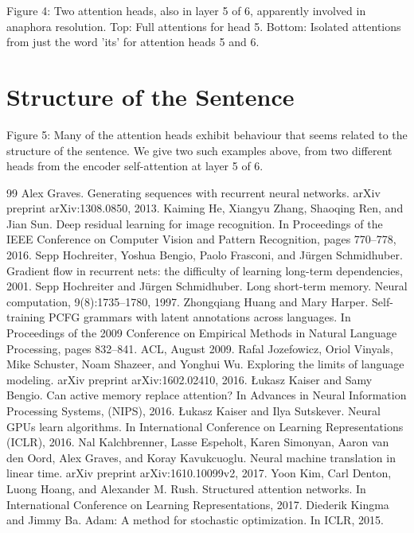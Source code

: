 \documentclass[conference]{IEEEtran}
\begin{document}
Figure 4: Two attention heads, also in layer 5 of 6, apparently involved in anaphora resolution. Top: Full attentions for head 5. Bottom: Isolated attentions from just the word 'its' for attention heads 5 and 6.

\section{Structure of the Sentence}
Figure 5: Many of the attention heads exhibit behaviour that seems related to the structure of the sentence. We give two such examples above, from two different heads from the encoder self-attention at layer 5 of 6.

\begin{thebibliography}{99}
 Alex Graves. Generating sequences with recurrent neural networks. arXiv preprint arXiv:1308.0850, 2013.
 Kaiming He, Xiangyu Zhang, Shaoqing Ren, and Jian Sun. Deep residual learning for image recognition. In Proceedings of the IEEE Conference on Computer Vision and Pattern Recognition, pages 770--778, 2016.
 Sepp Hochreiter, Yoshua Bengio, Paolo Frasconi, and Jürgen Schmidhuber. Gradient flow in recurrent nets: the difficulty of learning long-term dependencies, 2001.
 Sepp Hochreiter and Jürgen Schmidhuber. Long short-term memory. Neural computation, 9(8):1735--1780, 1997.
 Zhongqiang Huang and Mary Harper. Self-training PCFG grammars with latent annotations across languages. In Proceedings of the 2009 Conference on Empirical Methods in Natural Language Processing, pages 832--841. ACL, August 2009.
 Rafal Jozefowicz, Oriol Vinyals, Mike Schuster, Noam Shazeer, and Yonghui Wu. Exploring the limits of language modeling. arXiv preprint arXiv:1602.02410, 2016.
 Łukasz Kaiser and Samy Bengio. Can active memory replace attention? In Advances in Neural Information Processing Systems, (NIPS), 2016.
 Łukasz Kaiser and Ilya Sutskever. Neural GPUs learn algorithms. In International Conference on Learning Representations (ICLR), 2016.
 Nal Kalchbrenner, Lasse Espeholt, Karen Simonyan, Aaron van den Oord, Alex Graves, and Koray Kavukcuoglu. Neural machine translation in linear time. arXiv preprint arXiv:1610.10099v2, 2017.
 Yoon Kim, Carl Denton, Luong Hoang, and Alexander M. Rush. Structured attention networks. In International Conference on Learning Representations, 2017.
 Diederik Kingma and Jimmy Ba. Adam: A method for stochastic optimization. In ICLR, 2015.

\end{thebibliography}
\end{document}

